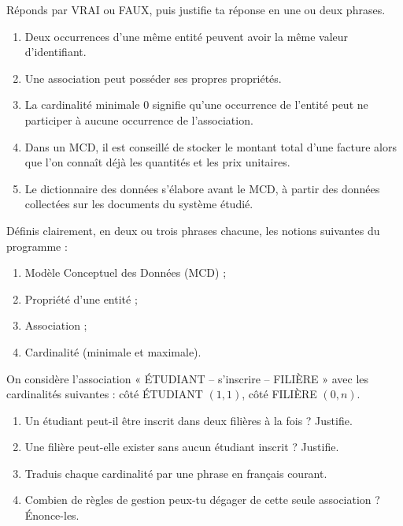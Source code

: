\documentclass[11pt]{article}
\begin{document}
\begin{exercice}
Réponds par VRAI ou FAUX, puis justifie ta réponse en une ou deux phrases.
\begin{enumerate}
\item Deux occurrences d'une même entité peuvent avoir la même valeur d'identifiant.
\item Une association peut posséder ses propres propriétés.
\item La cardinalité minimale $0$ signifie qu'une occurrence de l'entité peut ne participer à aucune occurrence de l'association.
\item Dans un MCD, il est conseillé de stocker le montant total d'une facture alors que l'on connaît déjà les quantités et les prix unitaires.
\item Le dictionnaire des données s'élabore avant le MCD, à partir des données collectées sur les documents du système étudié.
\end{enumerate}
\end{exercice}

\begin{exercice}[Définitions]
Définis clairement, en deux ou trois phrases chacune, les notions suivantes du programme :
\begin{enumerate}
\item Modèle Conceptuel des Données (MCD) ;
\item Propriété d'une entité ;
\item Association ;
\item Cardinalité (minimale et maximale).
\end{enumerate}
\end{exercice}

\begin{exercice}
On considère l'association « ÉTUDIANT -- s'inscrire -- FILIÈRE » avec les cardinalités suivantes : côté ÉTUDIANT $(1, 1)$, côté FILIÈRE $(0, n)$.
\begin{enumerate}
\item Un étudiant peut-il être inscrit dans deux filières à la fois ? Justifie.
\item Une filière peut-elle exister sans aucun étudiant inscrit ? Justifie.
\item Traduis chaque cardinalité par une phrase en français courant.
\item Combien de règles de gestion peux-tu dégager de cette seule association ? Énonce-les.
\end{enumerate}
\end{exercice}
\end{document}
